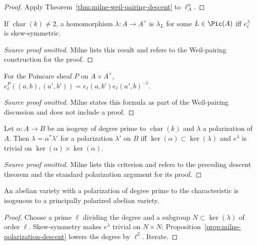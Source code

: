\begin{proof}
Apply Theorem~\ref{thm:milne-weil-pairing-descent} to $\ell^n_A$.
\end{proof}

\begin{proposition}\label{prop:milne-weil-pairing-skew}
If $\operatorname{char}(k)\ne2$, a homomorphism $\lambda:A\to A^\vee$ is $\lambda_L$ for some $L\in\Pic(A)$ iff $e_\ell^\lambda$ is skew-symmetric.
\end{proposition}
\begin{proof}[Source proof omitted]
Milne lists this result and refers to the Weil-pairing construction for the
proof.
\end{proof}
\begin{lemma}\label{lem:milne-poincare-pairing}
For the Poincare sheaf $P$ on $A\times A^\vee$, $e_\ell^P((a,b),(a',b'))=e_\ell(a,b')e_\ell(a',b)^{-1}$.
\end{lemma}
\begin{proof}[Source proof omitted]
Milne states this formula as part of the Weil-pairing discussion and does not
include a proof.
\end{proof}
\begin{proposition}\label{prop:milne-polarization-descent}
Let $\alpha:A\to B$ be an isogeny of degree prime to $\operatorname{char}(k)$ and $\lambda$ a polarization of $A$. Then $\lambda=\alpha^*\lambda'$ for a polarization $\lambda'$ on $B$ iff $\ker(\alpha)\subset\ker(\lambda)$ and $e^\lambda$ is trivial on $\ker(\alpha)\times\ker(\alpha)$.
\end{proposition}
\begin{proof}[Source proof omitted]
Milne lists this criterion and refers to the preceding descent theorem and the
standard polarization argument for its proof.
\end{proof}
\begin{corollary}\label{cor:milne-principal-polarization}
An abelian variety with a polarization of degree prime to the characteristic is isogenous to a principally polarized abelian variety.
\end{corollary}

\begin{proof}

Choose a prime $\ell$ dividing the degree and a subgroup $N\subset\ker(\lambda)$ of order $\ell$. Skew-symmetry makes $e^\lambda$ trivial on $N\times N$; Proposition~\ref{prop:milne-polarization-descent} lowers the degree by $\ell^2$. Iterate.

\end{proof}

